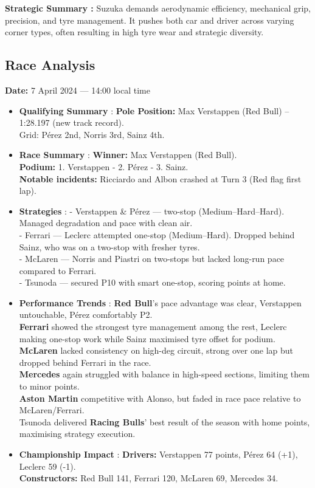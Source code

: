 \textbf{Strategic Summary :}
Suzuka demands aerodynamic efficiency, mechanical grip, precision, and tyre management. It pushes both car and driver across varying corner types, often resulting in high tyre wear and strategic diversity.


\subsection{Race Analysis}

\textbf{Date:} 7 April 2024 — 14:00 local time 

\begin{itemize}
    \item \textbf{Qualifying Summary} : \textbf{Pole Position:} Max Verstappen (Red Bull) – 1:28.197 (new track record). \\
    Grid: Pérez 2nd, Norris 3rd, Sainz 4th.
    
    \item \textbf{Race Summary} : \textbf{Winner:} Max Verstappen (Red Bull). \\
    \textbf{Podium:} 1. Verstappen - 2. Pérez - 3. Sainz.\\
    \textbf{Notable incidents:} Ricciardo and Albon crashed at Turn 3 (Red flag first lap).
    
    \item \textbf{Strategies} : 
    - Verstappen \& Pérez — two-stop (Medium–Hard–Hard). Managed degradation and pace with clean air.\\
    - Ferrari — Leclerc attempted one-stop (Medium–Hard). Dropped behind Sainz, who was on a two-stop with fresher tyres. \\
    - McLaren — Norris and Piastri on two-stops but lacked long-run pace compared to Ferrari. \\
    - Tsunoda — secured P10 with smart one-stop, scoring points at home.

    \item \textbf{Performance Trends} : \textbf{Red Bull}’s pace advantage was clear, Verstappen untouchable, Pérez comfortably P2. \\
    \textbf{Ferrari} showed the strongest tyre management among the rest, Leclerc making one-stop work while Sainz maximised tyre offset for podium. \\
    \textbf{McLaren} lacked consistency on high-deg circuit, strong over one lap but dropped behind Ferrari in the race. \\
    \textbf{Mercedes} again struggled with balance in high-speed sections, limiting them to minor points. \\
    \textbf{Aston Martin} competitive with Alonso, but faded in race pace relative to McLaren/Ferrari. \\
    Tsunoda delivered \textbf{Racing Bulls}’ best result of the season with home points, maximising strategy execution. 
    
    \item \textbf{Championship Impact} : \textbf{Drivers:} Verstappen 77 points, Pérez 64 (+1), Leclerc 59 (-1).\\
    \textbf{Constructors:} Red Bull 141, Ferrari 120, McLaren 69, Mercedes 34.
\end{itemize}



